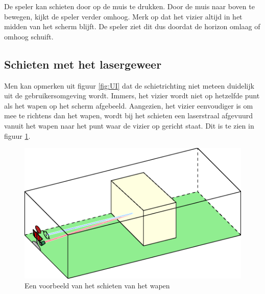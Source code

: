 De speler kan schieten door op de muis te drukken. Door de muis naar boven te bewegen, kijkt de speler verder omhoog. Merk op dat het vizier altijd in het midden van het scherm blijft. De speler ziet dit dus doordat de horizon omlaag of omhoog schuift.
\FloatBarrier
\subsection{Schieten met het lasergeweer}
Men kan opmerken uit figuur \ref{fig:UI} dat de schietrichting niet meteen duidelijk uit de gebruikersomgeving wordt. Immers, het vizier wordt niet op hetzelfde punt als het wapen op het scherm afgebeeld. Aangezien, het vizier eenvoudiger is om mee te richtens dan het wapen, wordt bij het schieten een laserstraal afgevuurd vanuit het wapen naar het punt waar de vizier op gericht staat. Dit is te zien in figuur \ref{fig:COL}.
 
\begin{figure}[H]
\includegraphics[width=\textwidth]{Graphics/Collision.eps}
\caption{Een voorbeeld van het schieten van het wapen}
\label{fig:COL}
\end{figure}


